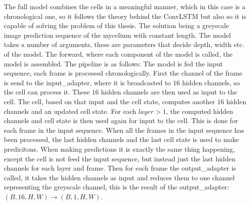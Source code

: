 \documentclass[a4paper,12pt]{article}
\begin{document}
The full model combines the cells in a meaningful manner, which in this case is a chronological one, so it follows the theory behind the ConvLSTM but also so it is capable of solving the problem of this thesis. The solution being a greyscale image prediction sequence of the mycelium with constant length. 
The model takes a number of arguments, these are parameters that decide depth, width etc. of the model. The forward, where each component of the model is called, the model is assembled. The pipeline is as follows:
The model is fed the input sequence, each frame is processed chronologically. First the channel of the frame is send to the input\_adapter, where it is broadcasted to $16$ hidden channels, so the cell can process it. These $16$ hidden channels are then used as input to the cell. The cell, based on that input and the cell state, computes another $16$ hidden channels and an updated cell state. For each $layer > 1$, the computed hidden channels and cell state is then used again for input to the cell. This is done for each frame in the input sequence.
When all the frames in the input sequence has been processed, the last hidden channels and the last cell state is used to make predicitons. When making predictions it is exactly the same thing happening, except the cell is not feed the input sequence, but instead just the last hidden channels for each layer and frame. Then for each frame the output\_adapter is called, it takes the hidden channels as input and reduces them to one channel representing the greyscale channel, this is the result of the output\_adapter: $(B, 16, H, W) \rightarrow (B, 1, H, W)$.
\end{document}
